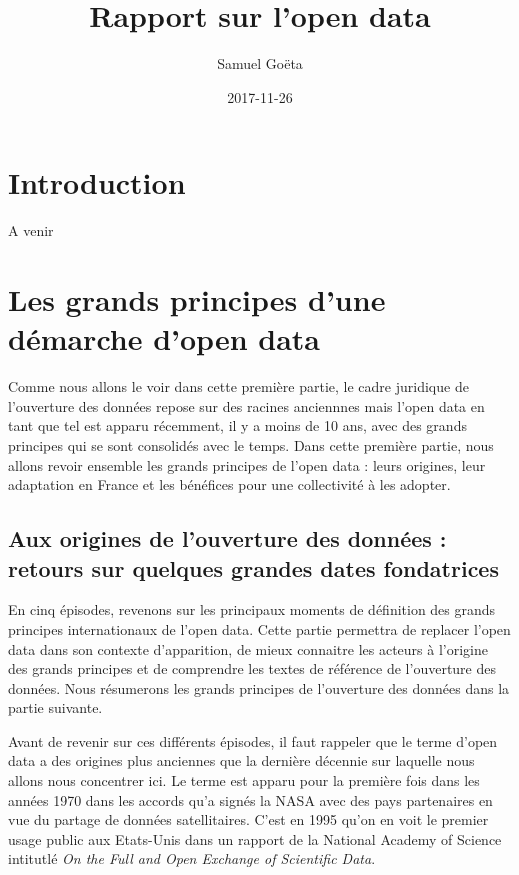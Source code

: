\documentclass[]{book}
\title{Rapport sur l'open data}
\author{Samuel Goëta}
\date{2017-11-26}
\theoremstyle{definition}
\theoremstyle{definition}
\theoremstyle{definition}
\theoremstyle{remark}
\begin{document}
\maketitle

{
\setcounter{tocdepth}{1}
\tableofcontents
}
\chapter*{Introduction}\label{introduction}

A venir

\chapter{Les grands principes d'une démarche d'open
data}\label{les-grands-principes-dune-demarche-dopen-data}

Comme nous allons le voir dans cette première partie, le cadre juridique
de l'ouverture des données repose sur des racines anciennnes mais l'open
data en tant que tel est apparu récemment, il y a moins de 10 ans, avec
des grands principes qui se sont consolidés avec le temps. Dans cette
première partie, nous allons revoir ensemble les grands principes de
l'open data : leurs origines, leur adaptation en France et les bénéfices
pour une collectivité à les adopter.

\section{Aux origines de l'ouverture des données : retours sur quelques
grandes dates
fondatrices}\label{aux-origines-de-louverture-des-donnees-retours-sur-quelques-grandes-dates-fondatrices}

En cinq épisodes, revenons sur les principaux moments de définition des
grands principes internationaux de l'open data. Cette partie permettra
de replacer l'open data dans son contexte d'apparition, de mieux
connaitre les acteurs à l'origine des grands principes et de comprendre
les textes de référence de l'ouverture des données. Nous résumerons les
grands principes de l'ouverture des données dans la partie suivante.

Avant de revenir sur ces différents épisodes, il faut rappeler que le
terme d'open data a des origines plus anciennes que la dernière décennie
sur laquelle nous allons nous concentrer ici. Le terme est apparu pour
la première fois dans les années 1970 dans les accords qu'a signés la
NASA avec des pays partenaires en vue du partage de données
satellitaires. C'est en 1995 qu'on en voit le premier usage public aux
Etats-Unis dans un rapport de la National Academy of Science intitutlé
\emph{On the Full and Open Exchange of Scientific Data}.
\end{document}
